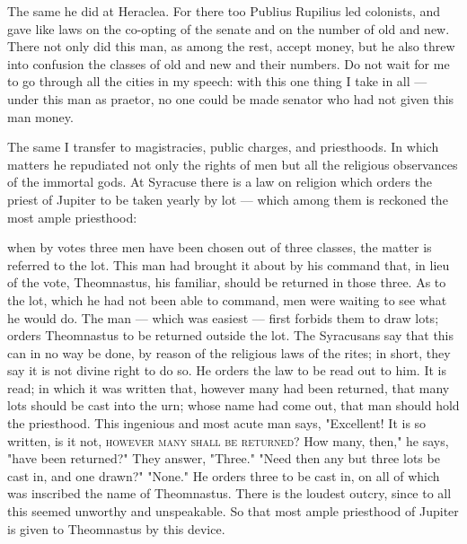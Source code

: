 The same he did at Heraclea. For there too Publius Rupilius led colonists, and gave like laws on the co-opting of the senate and on the number of old and new. There not only did this man, as among the rest, accept money, but he also threw into confusion the classes of old and new and their numbers. Do not wait for me to go through all the cities in my speech: with this one thing I take in all --- under this man as praetor, no one could be made senator who had not given this man money.

 The same I transfer to magistracies, public charges, and priesthoods. In which matters he repudiated not only the rights of men but all the religious observances of the immortal gods. At Syracuse there is a law on religion which orders the priest of Jupiter to be taken yearly by lot --- which among them is reckoned the most ample priesthood:

 when by votes three men have been chosen out of three classes, the matter is referred to the lot. This man had brought it about by his command that, in lieu of the vote, Theomnastus, his familiar, should be returned in those three. As to the lot, which he had not been able to command, men were waiting to see what he would do. The man --- which was easiest --- first forbids them to draw lots; orders Theomnastus to be returned outside the lot. The Syracusans say that this can in no way be done, by reason of the religious laws of the rites; in short, they say it is not divine right to do so. He orders the law to be read out to him. It is read; in which it was written that, however many had been returned, that many lots should be cast into the urn; whose name had come out, that man should hold the priesthood. This ingenious and most acute man says, "Excellent! It is so written, is it not, \textsc{however many shall be returned}? How many, then," he says, "have been returned?" They answer, "Three." "Need then any but three lots be cast in, and one drawn?" "None." He orders three to be cast in, on all of which was inscribed the name of Theomnastus. There is the loudest outcry, since to all this seemed unworthy and unspeakable. So that most ample priesthood of Jupiter is given to Theomnastus by this device.

